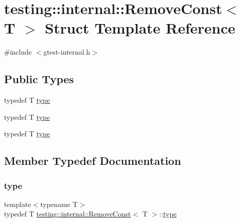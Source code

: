 \hypertarget{structtesting_1_1internal_1_1_remove_const}{}\section{testing\+::internal\+::Remove\+Const$<$ T $>$ Struct Template Reference}
\label{structtesting_1_1internal_1_1_remove_const}


{\ttfamily \#include $<$gtest-\/internal.\+h$>$}

\subsection*{Public Types}
\begin{DoxyCompactItemize}
\item 
typedef T \mbox{\hyperlink{structtesting_1_1internal_1_1_remove_const_a1be32027ea4edcc0d15abd59aba4a97f}{type}}
\item 
typedef T \mbox{\hyperlink{structtesting_1_1internal_1_1_remove_const_a1be32027ea4edcc0d15abd59aba4a97f}{type}}
\item 
typedef T \mbox{\hyperlink{structtesting_1_1internal_1_1_remove_const_a1be32027ea4edcc0d15abd59aba4a97f}{type}}
\end{DoxyCompactItemize}


\subsection{Member Typedef Documentation}
\mbox{\label{structtesting_1_1internal_1_1_remove_const_a1be32027ea4edcc0d15abd59aba4a97f}} 
\subsubsection{\texorpdfstring{type}{type}\hspace{0.1cm}{\footnotesize\ttfamily [1/3]}}
{\footnotesize\ttfamily template$<$typename T$>$ \\
typedef T \mbox{\hyperlink{structtesting_1_1internal_1_1_remove_const}{testing\+::internal\+::\+Remove\+Const}}$<$ T $>$\+::\mbox{\hyperlink{structtesting_1_1internal_1_1_remove_const_a1be32027ea4edcc0d15abd59aba4a97f}{type}}}

